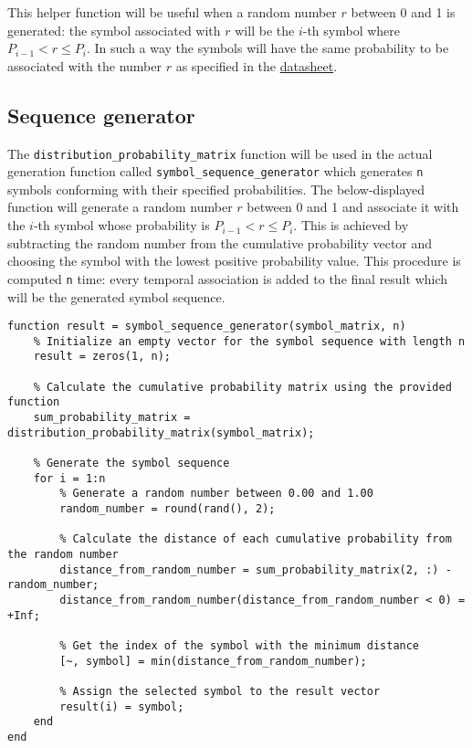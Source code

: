 \noindent This helper function will be useful when a random number $r$ between 0 and 1 is generated: the symbol associated with $r$ will be the $i$-th symbol where $P_{i-1} < r \leq P_i$. In such a way the symbols will have the same probability to be associated with the number $r$ as specified in the \hyperref[tab:source7]{datasheet}.


\subsection{Sequence generator}
The \texttt{distribution\_probability\_matrix} function will be used in the actual generation function called \texttt{symbol\_sequence\_generator} which generates \texttt{n} symbols conforming with their specified probabilities. The below-displayed function will generate a random number $r$ between 0 and 1 and associate it with the $i$-th symbol whose probability is $P_{i-1} < r \leq P_i$. This is achieved by subtracting the random number from the cumulative probability vector and choosing the symbol with the lowest positive probability value. This procedure is computed \texttt{n} time: every temporal association is added to the final result which will be the generated symbol sequence.

\begin{lstlisting}
function result = symbol_sequence_generator(symbol_matrix, n)
    % Initialize an empty vector for the symbol sequence with length n
    result = zeros(1, n);

    % Calculate the cumulative probability matrix using the provided function
    sum_probability_matrix = distribution_probability_matrix(symbol_matrix);
    
    % Generate the symbol sequence
    for i = 1:n
        % Generate a random number between 0.00 and 1.00
        random_number = round(rand(), 2);
        
        % Calculate the distance of each cumulative probability from the random number
        distance_from_random_number = sum_probability_matrix(2, :) - random_number;
        distance_from_random_number(distance_from_random_number < 0) = +Inf;

        % Get the index of the symbol with the minimum distance
        [~, symbol] = min(distance_from_random_number);
        
        % Assign the selected symbol to the result vector
        result(i) = symbol;
    end
end
\end{lstlisting}
